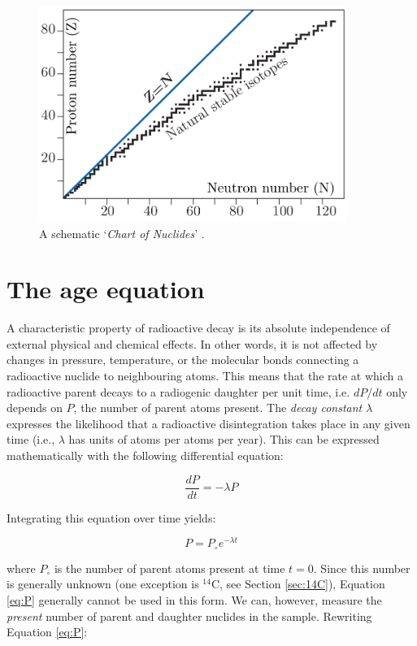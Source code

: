 \documentclass{book}
\newif\ifpdf
\begin{document}
\begin{figure}[!ht]
  \centering
  \ifpdf
  \def\svgwidth{.7\textwidth}
  
  \else
  \includegraphics[width=10cm]{chart-of-nuclides.png}
  \fi
  \caption{A schematic `\emph{Chart of Nuclides}' \citep[modified
      from][]{allegre2008}.}
  \label{fig:chart-of-nuclides}
\end{figure}

\section{The age equation}

A characteristic property of radioactive decay is its absolute
independence of external physical and chemical effects. In other
words, it is not affected by changes in pressure, temperature, or the
molecular bonds connecting a radioactive nuclide to neighbouring
atoms. This means that the rate at which a radioactive parent decays
to a radiogenic daughter per unit time, i.e. $dP/dt$ only depends on
$P$, the number of parent atoms present. The \emph{decay constant}
$\lambda$ expresses the likelihood that a radioactive disintegration
takes place in any given time (i.e., $\lambda$ has units of atoms per
atoms per year). This can be expressed mathematically with the
following differential equation:

\begin{equation}
\frac{dP}{dt} = -\lambda P
\label{eq:dPdt}
\end{equation}

Integrating this equation over time yields:

\begin{equation}
P = P_\circ e^{-\lambda t}
\label{eq:P}
\end{equation}

where $P_\circ$ is the number of parent atoms present at time
$t=0$.  Since this number is generally unknown (one exception is
$^{14}$C, see Section \ref{sec:14C}), Equation \ref{eq:P} generally
cannot be used in this form. We can, however, measure the
\emph{present} number of parent and daughter nuclides in the
sample. Rewriting Equation \ref{eq:P}:
\end{document}
